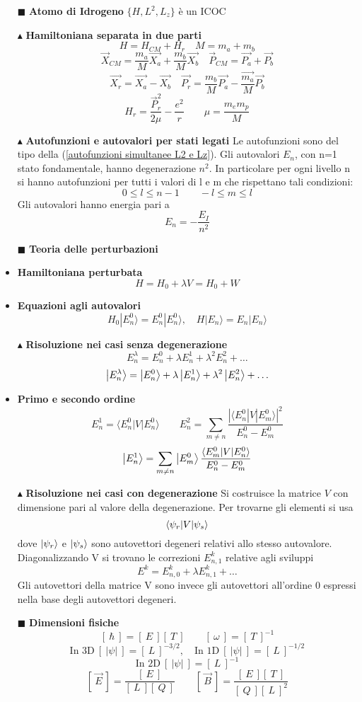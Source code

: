 \documentclass{book}
\newcommand{\g}{\textbf}
\newcommand{\e}{\begin{equation}}
\newcommand{\ex}{\end{equation} }
\renewcommand{\it}{\item[$\cdot$]}
\begin{document}
\begin{multicols}{4}
\begin{itemize}
\item [$\blacksquare$] \g{Atomo di Idrogeno}
$\{ H, L^{2},L_{z}\}$ è un ICOC
\item [$\blacktriangle$] \g{Hamiltoniana separata in due parti}
\e{H = H_{CM} + H_{r} \quad M = m_{a} + m_{b}}\ex
\e{\vec{X}_{CM} = \frac{m_{a}}{M}\vec{X_{a}} + \frac{m_{b}}{M}\vec{X_{b}} \quad \vec{P}_{CM} = \vec{P_{a}} + \vec{P_{b}}}\ex
\e{\vec{X_{r}} = \vec{X_{a}} - \vec{X_{b}} \quad \vec{P_{r}} = \frac{m_{b}}{M}\vec{P_{a}} - \frac{\vec{m_{a}}}{M}\vec{P_{b}}}\ex
\e{H_{r} = \frac{\vec{P}^{2}_{r}}{2 \mu} - \frac{e^{2}}{r} \qquad \mu = \frac{m_{e}m_{p}}{M}}\ex
\item [$\blacktriangle$] \g{Autofunzioni e autovalori per stati legati}
Le autofunzioni sono del tipo della (\ref{autofunzioni simultanee L2 e Lz}). Gli autovalori $E_{n}$, con n=1 stato fondamentale, hanno degenerazione $n^{2}$. In particolare per ogni livello n si hanno autofunzioni per tutti i valori di l e m che rispettano tali condizioni:
\e{0 \leq l  \leq n-1 \qquad -l \leq m \leq l}\ex
Gli autovalori hanno energia pari a 
\e{E_{n} = - \frac{E_{I}}{n^{2}}}\ex
\item [$\blacksquare$] \g{Teoria delle perturbazioni}
    \it \g{Hamiltoniana perturbata}
        \e{H = H_0 + \lambda V = H_0 + W} \ex
    \it \g{Equazioni agli autovalori}
        \e{H_0 |E_n^0\rangle = E_n^0 |E_n^0\rangle, \quad H |E_n\rangle = E_n |E_n\rangle} \ex
\item [$\blacktriangle$] \g{Risoluzione nei casi senza degenerazione}
\e{E_{n}^{\lambda} = E_{n}^{0} + \lambda E_{n}^{1} + \lambda^{2}E_{n}^{2} + \dots}\ex
\e{\ket{E_{n}^{\lambda}} = \ket{E_{n}^{0}} + \lambda \ket{E_{n}^{1}} + \lambda^{2}\ket{E_{n}^{2}} + \dots}\ex
    \it \g{Primo e secondo ordine}
        \e{E_n^1 = \langle E_n^0 | V | E_n^0 \rangle \qquad E_n^{2} = \sum_{m \neq n} \frac{|\langle E_n^0 | V | E_m^0 \rangle|^2}{E_n^0 - E_m^0}} \ex
        \e{\ket{E_{n}^{1}} =  \sum_{m \neq n} \ket{E_{m}^{0}}\frac{\langle E_m^0 | V | E_n^0 \rangle}{E_n^0 - E_m^0}}\ex
    \item [$\blacktriangle$] \g{Risoluzione nei casi con degenerazione}
    Si costruisce la matrice $V$ con dimensione pari al valore della degenerazione. Per trovarne gli elementi si usa 
    \e{\braket{\psi_{r}|V}{\psi_{s}}}\ex dove $\ket{\psi_{r}}$ e $\ket{\psi_{s}}$ sono autovettori degeneri relativi allo stesso autovalore. Diagonalizzando V si trovano le correzioni $E_{n,1}^{k}$ relative agli sviluppi
    \e{E^{k} = E_{n, 0}^{k} + \lambda E_{n,1}^{k} + \dots}\ex
    Gli autovettori della matrice V sono invece gli autovettori all'ordine 0 espressi nella base degli autovettori degeneri.
    \item [$\blacksquare$] \g{Dimensioni fisiche}
    \e{[\ \hbar\ ] = [\ E\ ][\ T\ ] \qquad [\ \omega \  ] = [\ T \ ]^{-1} }\ex
    \e{ \text{In 3D} \ [\ |\psi| \ ] = [\ L\ ]^{-3/2}, \quad \text{In 1D} \ [\ |\psi| \ ] = [\ L\ ]^{-1/2} }\ex
    \e{ \text{In 2D} \ [\ |\psi| \ ] = [\ L\ ]^{-1}}\ex
    \e{\left[ \ \vec{E} \ \right] = \frac{[\ E \ ]}{[ \ L \ ][ \ Q \ ]} \qquad \left[ \ \vec{B} \ \right] = \frac{[\ E \ ][\ T \ ]}{[\ Q \ ][\ L \ ]^{2}}}\ex
    

\end{itemize}
\end{multicols}
\end{document}
